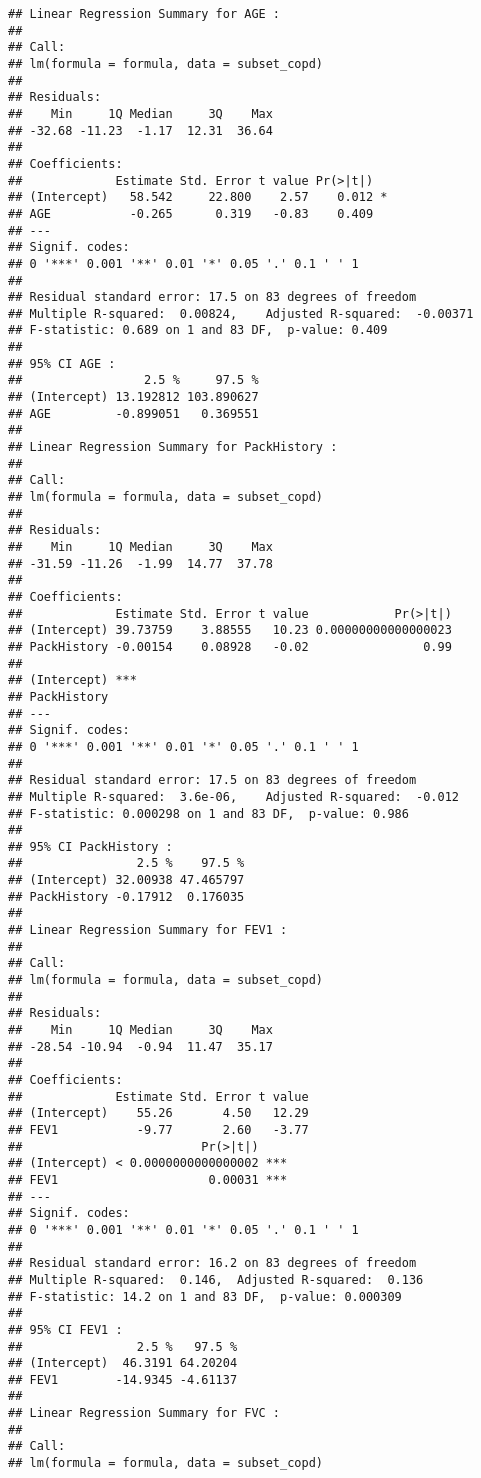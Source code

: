 \documentclass[
]{article}
\begin{document}
\begin{verbatim}
## Linear Regression Summary for AGE :
## 
## Call:
## lm(formula = formula, data = subset_copd)
## 
## Residuals:
##    Min     1Q Median     3Q    Max 
## -32.68 -11.23  -1.17  12.31  36.64 
## 
## Coefficients:
##             Estimate Std. Error t value Pr(>|t|)  
## (Intercept)   58.542     22.800    2.57    0.012 *
## AGE           -0.265      0.319   -0.83    0.409  
## ---
## Signif. codes:  
## 0 '***' 0.001 '**' 0.01 '*' 0.05 '.' 0.1 ' ' 1
## 
## Residual standard error: 17.5 on 83 degrees of freedom
## Multiple R-squared:  0.00824,    Adjusted R-squared:  -0.00371 
## F-statistic: 0.689 on 1 and 83 DF,  p-value: 0.409
## 
## 95% CI AGE :
##                 2.5 %     97.5 %
## (Intercept) 13.192812 103.890627
## AGE         -0.899051   0.369551
## 
## Linear Regression Summary for PackHistory :
## 
## Call:
## lm(formula = formula, data = subset_copd)
## 
## Residuals:
##    Min     1Q Median     3Q    Max 
## -31.59 -11.26  -1.99  14.77  37.78 
## 
## Coefficients:
##             Estimate Std. Error t value            Pr(>|t|)
## (Intercept) 39.73759    3.88555   10.23 0.00000000000000023
## PackHistory -0.00154    0.08928   -0.02                0.99
##                
## (Intercept) ***
## PackHistory    
## ---
## Signif. codes:  
## 0 '***' 0.001 '**' 0.01 '*' 0.05 '.' 0.1 ' ' 1
## 
## Residual standard error: 17.5 on 83 degrees of freedom
## Multiple R-squared:  3.6e-06,    Adjusted R-squared:  -0.012 
## F-statistic: 0.000298 on 1 and 83 DF,  p-value: 0.986
## 
## 95% CI PackHistory :
##                2.5 %    97.5 %
## (Intercept) 32.00938 47.465797
## PackHistory -0.17912  0.176035
## 
## Linear Regression Summary for FEV1 :
## 
## Call:
## lm(formula = formula, data = subset_copd)
## 
## Residuals:
##    Min     1Q Median     3Q    Max 
## -28.54 -10.94  -0.94  11.47  35.17 
## 
## Coefficients:
##             Estimate Std. Error t value
## (Intercept)    55.26       4.50   12.29
## FEV1           -9.77       2.60   -3.77
##                         Pr(>|t|)    
## (Intercept) < 0.0000000000000002 ***
## FEV1                     0.00031 ***
## ---
## Signif. codes:  
## 0 '***' 0.001 '**' 0.01 '*' 0.05 '.' 0.1 ' ' 1
## 
## Residual standard error: 16.2 on 83 degrees of freedom
## Multiple R-squared:  0.146,  Adjusted R-squared:  0.136 
## F-statistic: 14.2 on 1 and 83 DF,  p-value: 0.000309
## 
## 95% CI FEV1 :
##                2.5 %   97.5 %
## (Intercept)  46.3191 64.20204
## FEV1        -14.9345 -4.61137
## 
## Linear Regression Summary for FVC :
## 
## Call:
## lm(formula = formula, data = subset_copd)

\end{verbatim}
\end{document}
